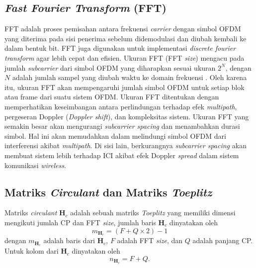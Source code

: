 \subsection{\textit{Fast Fourier Transform} (FFT)}
FFT adalah proses pemisahan antara frekuensi \textit{carrier} dengan simbol OFDM yang diterima pada sisi penerima sebelum didemodulasi dan diubah kembali ke dalam bentuk bit. FFT juga digunakan untuk implementasi \textit{discrete fourier transform} agar lebih cepat dan efisien. Ukuran FFT (FFT \textit{size}) mengacu pada jumlah \textit{subcarrier} dari simbol OFDM yang diharapkan sesuai ukuran $2^N$, dengan $N$ adalah jumlah sampel yang diubah waktu ke domain frekuensi \cite{fft}. Oleh karena itu, ukuran FFT akan mempengaruhi jumlah simbol OFDM untuk setiap blok atau frame dari suatu sistem OFDM. Ukuran FFT ditentukan dengan memperhatikan keseimbangan antara perlindungan terhadap efek \textit{multipath}, pergeseran Doppler (\textit{Doppler shift}), dan kompleksitas sistem. Ukuran FFT yang semakin besar akan mengurangi \textit{subcarrier spacing} dan menambahkan durasi simbol. Hal ini akan memudahkan dalam melindungi simbol OFDM dari interferensi akibat \textit{multipath}. Di sisi lain, berkurangnya \textit{subcarrier spacing} akan membuat sistem lebih terhadap ICI akibat efek Doppler \textit{spread} dalam sistem komunikasi \textit{wireless}. 



\subsection{Matriks \textit{Circulant} dan Matriks \textit{Toeplitz}}
Matriks \textit{circulant} $\mathbf{H}_c$ adalah sebuah matriks \textit{Toeplitz} yang memiliki dimensi mengikuti jumlah CP dan FFT \textit{size}, jumlah baris $\mathbf{H}_c$ dinyatakan oleh
\begin{equation}
	m_{\mathbf{H}_c}=(F+Q \times 2)-1
\end{equation}
dengan $m_{\mathbf{H}_c}$ adalah baris dari $\mathbf{H}_c$, $F$ adalah FFT \textit{size}, dan $Q$ adalah panjang CP. Untuk kolom dari $\mathbf{H}_c$ dinyatakan oleh
\begin{equation}
	n_{\mathbf{H}_c}=F+Q.
\end{equation}

